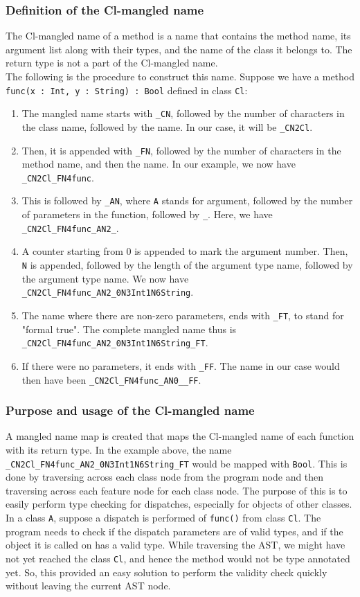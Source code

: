 \documentclass{article}
\begin{document}
\subsubsection*{Definition of the Cl-mangled name}
The Cl-mangled name of a method is a name that contains the method name, its argument list along with their types, and the name of the class it belongs to. The return type is not a part of the Cl-mangled name.\\
The following is the procedure to construct this name. Suppose we have a method \\ \verb|func(x : Int, y : String) : Bool| defined in class \verb|Cl|:
\begin{enumerate}
	\item The mangled name starts with \verb|_CN|, followed by the number of characters in the class name, followed by the name. In our case, it will be \verb|_CN2Cl|.
	\item Then, it is appended with \verb|_FN|, followed by the number of characters in the method name, and then the name. In our example, we now have \verb|_CN2Cl_FN4func|.
	\item This is followed by \verb|_AN|, where \verb|A| stands for argument, followed by the number of parameters in the function, followed by \verb|_|. Here, we have \verb|_CN2Cl_FN4func_AN2_|.
	\item A counter starting from $0$ is appended to mark the argument number. Then, \verb|N| is appended, followed by the length of the argument type name, followed by the argument type name. We now have \verb|_CN2Cl_FN4func_AN2_0N3Int1N6String|.
	\item The name where there are non-zero parameters, ends with \verb|_FT|, to stand for "formal true". The complete mangled name thus is \verb|_CN2Cl_FN4func_AN2_0N3Int1N6String_FT|.
	\item If there were no parameters, it ends with \verb|_FF|. The name in our case would then have been \verb|_CN2Cl_FN4func_AN0__FF|.
\end{enumerate}
	
\subsubsection*{Purpose and usage of the Cl-mangled name}
A mangled name map is created that maps the Cl-mangled name of each function with its return type. In the example above, the name  \verb|_CN2Cl_FN4func_AN2_0N3Int1N6String_FT| would be mapped with \verb|Bool|. This is done by traversing across each class node from the program node and then traversing across each feature node for each class node. The purpose of this is to easily perform type checking for dispatches, especially for objects of other classes. In a class \verb|A|, suppose a dispatch is performed of \verb|func()| from class \verb|Cl|. The program needs to check if the dispatch parameters are of valid types, and if the object it is called on has a valid type. While traversing the AST, we might have not yet reached the class \verb|Cl|, and hence the method would not be type annotated yet. So, this provided an easy solution to perform the validity check quickly without leaving the current AST node.
\end{document}
